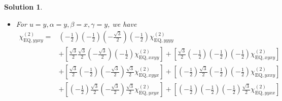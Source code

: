 \documentclass[UTF8,10pt,a4paper]{article}
\theoremstyle{Problem}
\theoremstyle{Solution}
\newtheorem*{sol}{Solution}
\begin{document}
\begin{sol}
\begin{itemize}
\begin{align}
\nonumber\chi_{\text{EQ},yyxx}^{(2)}=&\left(-\frac{1}{2}\right)\left(-\frac{1}{2}\right)\left(-\frac{\sqrt{3}}{2}\right)\left(-\frac{\sqrt{3}}{2}\right)\chi_{\text{EQ},yyyy}^{(2)}\\
\nonumber&+\left[\frac{\sqrt{3}}{2}\frac{\sqrt{3}}{2}\left(-\frac{\sqrt{3}}{2}\right)\left(-\frac{\sqrt{3}}{2}\right)\chi_{\text{EQ},xxyy}^{(2)}\right]+\left[\frac{\sqrt{3}}{2}\left(-\frac{1}{2}\right)\left(-\frac{1}{2}\right)\left(-\frac{\sqrt{3}}{2}\right)\chi_{\text{EQ},xyxy}^{(2)}\right]\\
\nonumber&+\left[\frac{\sqrt{3}}{2}\left(-\frac{1}{2}\right)\left(-\frac{\sqrt{3}}{2}\right)\left(-\frac{1}{2}\right)\chi_{\text{EQ},xyyx}^{(2)}\right]+\left[\left(-\frac{1}{2}\right)\frac{\sqrt{3}}{2}\left(-\frac{1}{2}\right)\left(-\frac{\sqrt{3}}{2}\right)\chi_{\text{EQ},yxxy}^{(2)}\right]\\
\nonumber&+\left[\left(-\frac{1}{2}\right)\frac{\sqrt{3}}{2}\left(-\frac{\sqrt{3}}{2}\right)\left(-\frac{1}{2}\right)\chi_{\text{EQ},yxyx}^{(2)}\right]+\left[\left(-\frac{1}{2}\right)\left(-\frac{1}{2}\right)\left(-\frac{1}{2}\right)\left(-\frac{1}{2}\right)\chi_{\text{EQ},yyxx}^{(2)}\right]\\
&+\left[\frac{\sqrt{3}}{2}\frac{\sqrt{3}}{2}\left(-\frac{1}{2}\right)\left(-\frac{1}{2}\right)\chi_{\text{EQ},xxxx}^{(2)}\right]
\end{align}\normalsize
\item For $u=y,\alpha=y,\beta=x,\gamma=y$, we have
\footnotesize\begin{align}
\nonumber\chi_{\text{EQ},yyxy}^{(2)}=&\left(-\frac{1}{2}\right)\left(-\frac{1}{2}\right)\left(-\frac{\sqrt{3}}{2}\right)\left(-\frac{1}{2}\right)\chi_{\text{EQ},yyyy}^{(2)}\\
\nonumber&+\left[\frac{\sqrt{3}}{2}\frac{\sqrt{3}}{2}\left(-\frac{\sqrt{3}}{2}\right)\left(-\frac{1}{2}\right)\chi_{\text{EQ},xxyy}^{(2)}\right]+\left[\frac{\sqrt{3}}{2}\left(-\frac{1}{2}\right)\left(-\frac{1}{2}\right)\left(-\frac{1}{2}\right)\chi_{\text{EQ},xyxy}^{(2)}\right]\\
\nonumber&+\left[\frac{\sqrt{3}}{2}\left(-\frac{1}{2}\right)\left(-\frac{\sqrt{3}}{2}\right)\frac{\sqrt{3}}{2}\chi_{\text{EQ},xyyx}^{(2)}\right]+\left[\left(-\frac{1}{2}\right)\frac{\sqrt{3}}{2}\left(-\frac{1}{2}\right)\left(-\frac{1}{2}\right)\chi_{\text{EQ},yxxy}^{(2)}\right]\\
\nonumber&+\left[\left(-\frac{1}{2}\right)\frac{\sqrt{3}}{2}\left(-\frac{\sqrt{3}}{2}\right)\frac{\sqrt{3}}{2}\chi_{\text{EQ},yxyx}^{(2)}\right]+\left[\left(-\frac{1}{2}\right)\left(-\frac{1}{2}\right)\left(-\frac{1}{2}\right)\frac{\sqrt{3}}{2}\chi_{\text{EQ},yyxx}^{(2)}\right]\\

\end{align}
\end{itemize}
\end{sol}
\end{document}
